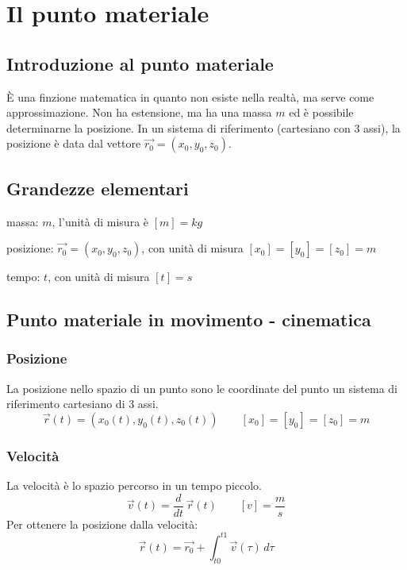 \documentclass[a4paper]{article}
\newcommand\dt{\frac{d}{dt}\,}
\begin{document}
\section{Il punto materiale}
\subsection{Introduzione al punto materiale}
È una finzione matematica in quanto non esiste nella realtà, ma serve come approssimazione. Non ha estensione, ma ha una massa
\(m\) ed è possibile determinarne la posizione. In un sistema di riferimento (cartesiano con 3 assi), la posizione è data dal
vettore \(\vec{r_0} = \left(x_0, y_0, z_0\right)\).

\subsection{Grandezze elementari}

massa: \(m\), l'unità di misura è \(\left[m\right] = kg\)

posizione: \(\vec{r_0} = \left(x_0, y_0, z_0\right)\), con unità di misura \(\left[x_0\right] = \left[y_0\right] = \left[z_0\right] = m\)

tempo: \(t\), con unità di misura \(\left[t\right] = s\)

\newpage


\subsection{Punto materiale in movimento - cinematica}
\subsubsection*{Posizione}
La posizione nello spazio di un punto sono le coordinate del punto un sistema di riferimento cartesiano di 3 assi.
\[\vec{r}(t) = \left(x_0(t), y_0(t), z_0(t)\right) \qquad \left[x_0\right] = \left[y_0\right] = \left[z_0\right] = m\]

\subsubsection*{Velocità}
La velocità è lo spazio percorso in un tempo piccolo. \[\vec{v}(t) = \dt \vec{r}(t) \qquad \left[v\right] = \frac{m}{s}\]
Per ottenere la posizione dalla velocità: \[\vec{r}(t) = \vec{r_0} + \int_{t0}^{t1} \vec{v}(\tau) \, d\tau\]
\end{document}
